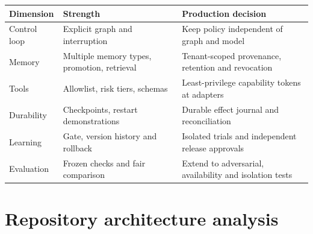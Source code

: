 \documentclass[11pt,letterpaper]{article}
\begin{document}
\begin{tabularx}{\linewidth}{p{.22\linewidth}YY}\toprule
Dimension & Strength & Production decision \\\midrule
Control loop & Explicit graph and interruption & Keep policy independent of graph and model \\
Memory & Multiple memory types, promotion, retrieval & Tenant-scoped provenance, retention and revocation \\
Tools & Allowlist, risk tiers, schemas & Least-privilege capability tokens at adapters \\
Durability & Checkpoints, restart demonstrations & Durable effect journal and reconciliation \\
Learning & Gate, version history and rollback & Isolated trials and independent release approvals \\
Evaluation & Frozen checks and fair comparison & Extend to adversarial, availability and isolation tests \\
\bottomrule\end{tabularx}
\section{Repository architecture analysis}
\end{document}
